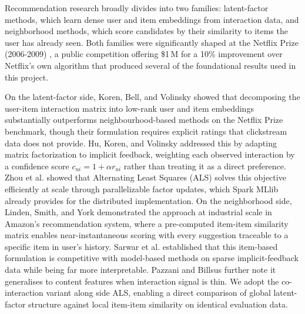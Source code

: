 \documentclass[a4paper,oneside,12pt]{book}
\begin{document}


Recommendation research broadly divides into two families: latent-factor methods, which learn dense user and item embeddings from interaction data, and neighborhood methods, which score candidates by their similarity to items the user has already seen. Both families were significantly shaped at the Netflix Prize (2006-2009) \cite{bennett2007netflix}, a public competition offering \$1\,M for a 10\% improvement over Netflix's own algorithm that produced several of the foundational results used in this project.

On the latent-factor side, Koren, Bell, and Volinsky \cite{koren2009matrix} showed that decomposing the user-item interaction matrix into low-rank user and item
embeddings substantially outperforms neighbourhood-based methods on the Netflix
Prize benchmark, though their formulation requires explicit ratings that clickstream data does not provide. Hu, Koren, and Volinsky \cite{hu2008collaborative} addressed
this by adapting matrix factorization to implicit feedback, weighting each observed
interaction by a confidence score $c_{ui} = 1 + \alpha r_{ui}$ rather than treating
it as a direct preference. Zhou et al. \cite{zhou2008largescale} showed that
Alternating Least Squares (ALS) solves this objective efficiently at scale through
parallelizable factor updates, which Spark MLlib already provides for the distributed implementation. On the neighborhood side, Linden, Smith, and York \cite{linden2003amazon} demonstrated the approach at industrial scale in Amazon's recommendation system, where a pre-computed item-item similarity matrix enables near-instantaneous scoring with every suggestion traceable to a specific item in user's history. Sarwar
et al. \cite{sarwar2001item} established that this item-based formulation is competitive with model-based methods on sparse implicit-feedback data while being far more interpretable. Pazzani and Billsus \cite{pazzani2007content} further note it generalises to content features when interaction signal is thin. We adopt the co-interaction variant along side ALS, enabling a direct comparison of global latent-factor structure against local item-item similarity on identical evaluation data.
\end{document}
